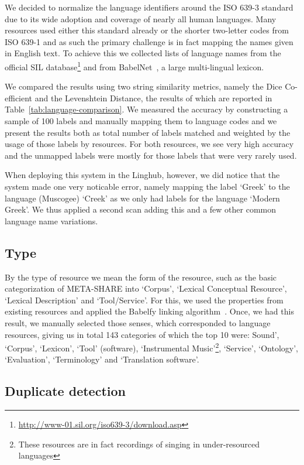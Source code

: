 \documentclass[smallextended]{svjour3}       %
\begin{document}
We decided to normalize the language identifiers around the ISO 639-3 standard
due to its wide adoption and coverage of nearly all human languages. Many
resources used either this standard already or the shorter two-letter codes from
ISO 639-1 and as such the primary challenge is in fact mapping the names given
in English text. To achieve this we collected lists of language names from the
official SIL
database\footnote{\url{http://www-01.sil.org/iso639-3/download.asp}} and from
BabelNet~\cite{navigli2010babelnet}, a large multi-lingual lexicon.

We compared the results using two string similarity metrics, namely the Dice
Co-efficient and the Levenshtein Distance, the results of which are reported in
Table~\ref{tab:language-comparison}. We measured the accuracy by constructing a
sample of 100 labels and manually mapping them to language codes and we present
the results both as total number of labels matched and weighted by the usage of
those labels by resources. For both resources, we see very high accuracy and the
unmapped labels were mostly for those labels that were very rarely used. 

When deploying this system in the Linghub, however, we did notice that the
system made one very noticable error, namely mapping the label `Greek' to the
language (Muscogee) `Creek' as we only had labels for the language `Modern
Greek'. We thus applied a second scan adding this and a few other common
language name variations.

\subsection{Type}

By the type of resource we mean the form of the resource, such as the basic
categorization of META-SHARE into `Corpus', `Lexical Conceptual Resource', 
`Lexical Description' and `Tool/Service'. For this, we used the properties from
existing resources and applied the Babelfy linking
algorithm~\cite{Moroetal:14tacl}. Once, we
had this result, we manually selected those senses, which corresponded to
language resources, giving us in total 143 categories of which the top 10 were:
Sound', `Corpus',
`Lexicon', `Tool' (software), `Instrumental Music'\footnote{These
resources are in fact recordings of singing in under-resourced languages},
`Service', `Ontology', `Evaluation',
`Terminology' and `Translation software'.


\subsection{Duplicate detection}
\end{document}
